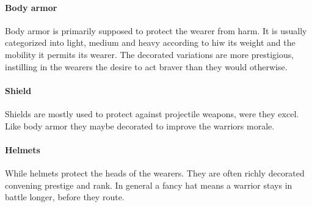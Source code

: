 \paragraph{Body armor}
Body armor is primarily supposed to protect the wearer from harm. It is usually
categorized into light, medium and heavy according to hiw its weight and the
mobility it permits its wearer. The decorated variations are more prestigious,
instilling in the wearers the desire to act braver than they would otherwise.

\paragraph{Shield}
Shields are mostly used to protect against projectile weapons, were they excel.
Like body armor they maybe decorated to improve the warriors morale.

\paragraph{Helmets}
While helmets protect the heads of the wearers. They are often richly decorated
convening prestige and rank. In general a fancy hat means a warrior stays in
battle longer, before they route.

\printglossary[type=good, title=Glossary]{}\label{ch:Goods:Glossary}

